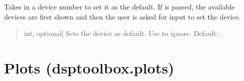 \documentclass[letterpaper,10pt,english]{sphinxmanual}
\begin{document}

\begin{fulllineitems}
\label{\detokenize{modules/dsptoolbox.measure:dsptoolbox.measure.set_device}}
\pysigstartsignatures
{}
\pysigstopsignatures
\sphinxAtStartPar
Takes in a device number to set it as the default. If  is passed,
the available devices are first shown and then the user is asked for
input to set the device.
\begin{quote}\begin{description}
\begin{description}
\sphinxlineitem{\sphinxstylestrong{device\_number}}{[}int, optional{]}
\sphinxAtStartPar
Sets the device as default. Use  to ignore. Default: .

\end{description}

\end{description}\end{quote}

\end{fulllineitems}


\sphinxstepscope


\section{Plots (dsptoolbox.plots)}
\label{\detokenize{modules/dsptoolbox.plots:module-dsptoolbox.plots}}\label{\detokenize{modules/dsptoolbox.plots:plots-dsptoolbox-plots}}\label{\detokenize{modules/dsptoolbox.plots::doc}}
\end{document}
